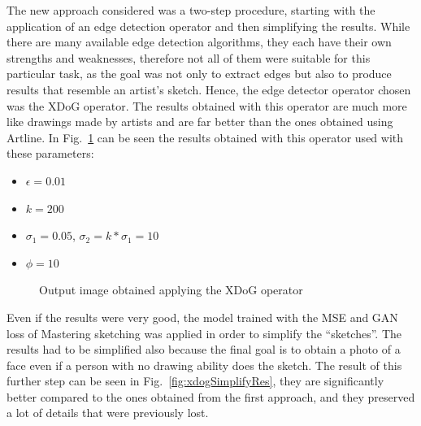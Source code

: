 \noindent The new approach considered was a two-step procedure, starting with the application of an edge detection operator and then simplifying the results. 
While there are many available edge detection algorithms, they each have their own strengths and weaknesses, therefore not all of them were suitable for this particular task, as the goal was not only to extract edges but also to produce results that resemble an artist’s sketch. 
Hence, the edge detector operator chosen was the XDoG operator. 
The results obtained with this operator are much more like drawings made by artists and are far better than the ones obtained using Artline. In Fig.~\ref{fig:xdogRes} can be seen the results obtained with this operator used with these parameters:
\begin{itemize}
\setlength{\itemsep}{1pt}
\setlength{\parskip}{0pt}
\setlength{\parsep}{0pt}
    \item $\epsilon = 0.01$
    \item $k = 200$
    \item $\sigma_1 = 0.05$,  $\sigma_2=k * \sigma_1 = 10$
    \item $\phi = 10$
\end{itemize}

\begin{figure}[htbp]
    \centering
     \quad
    \caption{Output image obtained applying the XDoG operator}
    \label{fig:xdogRes}
\end{figure}

\noindent Even if the results were very good, the model trained with the MSE and GAN loss of Mastering sketching was applied in order to simplify the “sketches”. The results had to be simplified also because the final goal is to obtain a photo of a face even if a person with no drawing ability does the sketch.
The result of this further step can be seen in Fig.~\ref{fig:xdogSimplifyRes}, they are significantly better compared to the ones obtained from the first approach, and they preserved a lot of details that were previously lost. 

